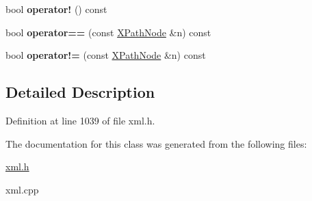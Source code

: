 \begin{DoxyCompactItemize}
\item 
\hypertarget{classphys_1_1xml_1_1XPathNode_a58aa93c54d484cc8ae4e4c05d2b62ffd}{
bool {\bfseries operator!} () const }
\label{df/dd4/classphys_1_1xml_1_1XPathNode_a58aa93c54d484cc8ae4e4c05d2b62ffd}

\item 
\hypertarget{classphys_1_1xml_1_1XPathNode_ab13702ded8707602871596e4f34e8302}{
bool {\bfseries operator==} (const \hyperlink{classphys_1_1xml_1_1XPathNode}{XPathNode} \&n) const }
\label{df/dd4/classphys_1_1xml_1_1XPathNode_ab13702ded8707602871596e4f34e8302}

\item 
\hypertarget{classphys_1_1xml_1_1XPathNode_a121ba0e04b6619f45c5392374f2dc98d}{
bool {\bfseries operator!=} (const \hyperlink{classphys_1_1xml_1_1XPathNode}{XPathNode} \&n) const }
\label{df/dd4/classphys_1_1xml_1_1XPathNode_a121ba0e04b6619f45c5392374f2dc98d}

\end{DoxyCompactItemize}


\subsection{Detailed Description}


Definition at line 1039 of file xml.h.



The documentation for this class was generated from the following files:\begin{DoxyCompactItemize}
\item 
\hyperlink{xml_8h}{xml.h}\item 
xml.cpp\end{DoxyCompactItemize}
